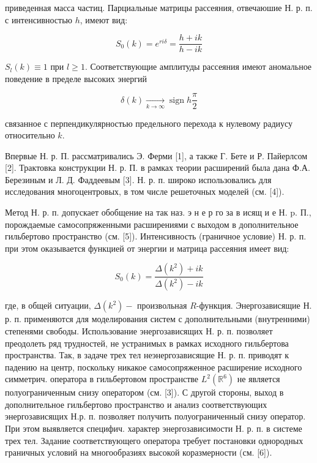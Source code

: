 \documentclass[10pt]{article}
\begin{document}
приведенная масса частиц. Парциальные матрицы рассеяния, отвечаюшие Н. р. п. с интенсивностью $h$, имеют вид:



\[

S_{0}(k)=e^{r i \delta}=\frac{h+i k}{h-i k}

\]



$S_{l}(k) \equiv 1$ при $l \geqslant 1$. Соответствующие амплитуды рассеяния имеют аномальное поведение в пределе высоких энергий



\[

\delta(k) \underset{k \rightarrow \infty}{\longrightarrow} \operatorname{sign} h \frac{\pi}{2}

\]



связанное с перпендикулярностью предельного перехода к нулевому радиусу относительно $k$.



Впервые Н. р. П. рассматривались Э. Ферми [1], а также Г. Бете и Р. Пайерлсом [2]. Трактовка конструкции Н. р. П. в рамках теории расширений была дана Ф.А. Березиным и Л. Д. Фаддеевым [3]. Н. р. п. широко использовались для исследования многоцентровых, в том числе решеточных моделей (см. [4]).



Метод Н. р. п. допускает обобщение на так наз. э н е р го за в исящ и е Н. p. П., порождаемые самосопряженными расширениями с выходом в дополнительное гильбертово пространство (см. [5]). Интенсивность (граничное условие) Н. р. п. при этом оказывается функцией от энергии и матрица рассеяния имеет вид:



\[

S_{0}(k)=\frac{\Delta\left(k^{2}\right)+i k}{\Delta\left(k^{2}\right)-i k}

\]



где, в общей ситуации, $\Delta\left(k^{2}\right)-$ произвольная $R$-функция. Энергозависящие Н. р. п. применяются для моделирования систем с дополнительными (внутренними) степенями свободы. Использование энергозависящих Н. р. п. позволяет преодолеть ряд трудностей, не устранимых в рамках исходного гильбертова пространства. Так, в задаче трех тел неэнергозависящие Н. р. п. приводят к падению на центр, поскольку никакое самосопряженное расширение исходного симметрич. оператора в гильбертовом пространстве $L^{2}\left(\mathbb{R}^{6}\right)$ не является полуограниченным снизу оператором (см. [3]). С другой стороны, выход в дополнительное гильбертово пространство и анализ соответствующих энергозависящих Н.р. п. позволяет получить полуограниченный снизу оператор. При этом выявляется специфич. характер энергозависимости Н. р. п. в системе трех тел. Задание соответствующего оператора требует постановки однородных граничных условий на многообразиях высокой коразмерности (см. [6]).
\end{document}
